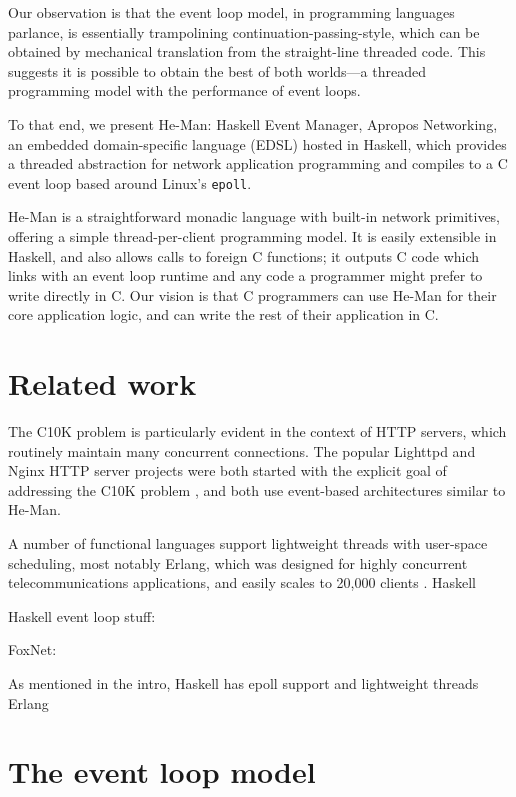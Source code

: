 \documentclass[preprint,11pt]{sigplanconf}
\renewcommand{\t}{\texttt}
\begin{document}
Our observation is that the event loop model, in programming languages parlance,
is essentially trampolining continuation-passing-style, which can be obtained by
mechanical translation from the straight-line threaded code. This suggests it is
possible to obtain the best of both worlds---a threaded programming model with
the performance of event loops. 

To that end, we present He-Man: Haskell Event Manager, Apropos Networking, an
embedded domain-specific language (EDSL) hosted in Haskell, which provides a
threaded abstraction for network application programming and compiles to a C
event loop based around Linux's \t{epoll}.

He-Man is a straightforward monadic language with built-in network primitives,
offering a simple thread-per-client programming model. It is easily extensible
in Haskell, and also allows calls to foreign C functions; it outputs C code
which links with an event loop runtime and any code a programmer might prefer to
write directly in C. Our vision is that C programmers can use He-Man for their
core application logic, and can write the rest of their application in C. 

\section{Related work}

The C10K problem is particularly evident in the context of HTTP servers, which
routinely maintain many concurrent connections. The popular Lighttpd and Nginx
HTTP server projects were both started with the explicit goal of addressing the
C10K problem \cite{Lighttpd,Nginx}, and both use event-based architectures
similar to He-Man.

A number of functional languages support lightweight threads with user-space
scheduling, most notably Erlang, which was designed for highly concurrent
telecommunications applications, and easily scales to 20,000 clients
\cite{Hellstrom}. Haskell 



Haskell event loop stuff: \cite{LiZdancewic}

FoxNet: \cite{BiagioniEtAl}

As mentioned in the intro,
Haskell has epoll support and lightweight threads
Erlang

\section{The event loop model}
\end{document}
